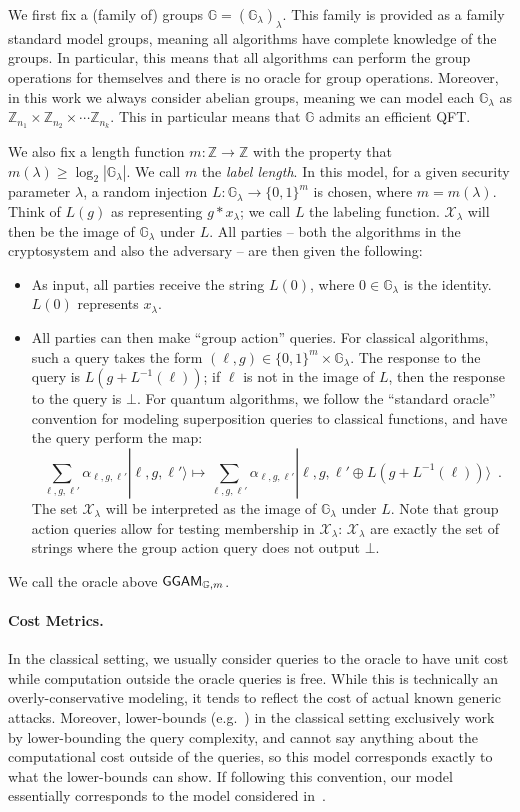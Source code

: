 \documentclass{article}\usepackage[a4paper,margin=20mm]{geometry}
\numberwithin{theorem}{section}
\numberwithin{equation}{section}
\newcommand{\Z}{\mathbb{Z}}
\newcommand{\G}{\mathbb{G}}
\newcommand{\Xs}{{\mathcal{X}}}
\newcommand{\GGAM}{{\sf GGAM}}
\begin{document}
We first fix a (family of) groups $\G=(\G_\lambda)_\lambda$. This family is provided as a family standard model groups, meaning all algorithms have complete knowledge of the groups.  In particular, this means that all algorithms can perform the group operations for themselves and there is no oracle for group operations. Moreover, in this work we always consider abelian groups, meaning we can model each $\G_\lambda$ as $\Z_{n_1}\times \Z_{n_2}\times\cdots\Z_{n_k}$. This in particular means that $\G$ admits an efficient QFT. 

We also fix a length function $m:\Z\rightarrow\Z$ with the property that $m(\lambda)\geq\log_2|\G_\lambda|$. We call $m$ the \emph{label length}. In this model, for a given security parameter $\lambda$, a random injection $L:\G_\lambda\rightarrow\{0,1\}^{m}$ is chosen, where $m=m(\lambda)$. Think of $L(g)$ as representing $g*x_\lambda$; we call $L$ the labeling function. $\Xs_\lambda$ will then be the image of $\G_\lambda$ under $L$. All parties -- both the algorithms in the cryptosystem and also the adversary -- are then given the following:
\begin{itemize}
	\item As input, all parties receive the string $L(0)$, where $0\in\G_\lambda$ is the identity. $L(0)$ represents $x_\lambda$.
	\item All parties can then make ``group action'' queries. For classical algorithms, such a query takes the form $(\ell,g)\in\{0,1\}^m\times\G_\lambda$. The response to the query is $L(g+L^{-1}(\ell))$; if $\ell$ is not in the image of $L$, then the response to the query is $\bot$. For quantum algorithms, we follow the ``standard oracle'' convention for modeling superposition queries to classical functions, and have the query perform the map:
	\[\sum_{\ell,g,\ell'}\alpha_{\ell,g,\ell'}|\ell,g,\ell'\rangle\mapsto\sum_{\ell,g,\ell'}\alpha_{\ell,g,\ell'}|\ell,g,\ell'\oplus L(g+L^{-1}(\ell))\rangle\enspace .\]
	The set $\Xs_\lambda$ will be interpreted as the image of $\G_\lambda$ under $L$. Note that group action queries allow for testing membership in $\Xs_\lambda$: $\Xs_\lambda$ are exactly the set of strings where the group action query does not output $\bot$.
\end{itemize}
We call the oracle above $\GGAM_{\G,m}$. 

\paragraph{Cost Metrics.}In the classical setting, we usually consider queries to the oracle to have unit cost while computation outside the oracle queries is free. While this is technically an overly-conservative modeling, it tends to reflect the cost of actual known generic attacks. Moreover, lower-bounds (e.g.~\cite{EC:Shoup97}) in the classical setting exclusively work by lower-bounding the query complexity, and cannot say anything about the computational cost outside of the queries, so this model corresponds exactly to what the lower-bounds can show. If following this convention, our model essentially corresponds to the model considered in~\cite{PKC:DHKKLR23}. 
\end{document}
